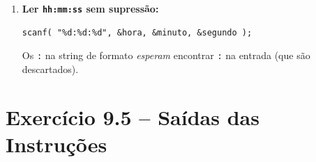 \documentclass[12pt,a4paper]{article}
\begin{document}
\begin{respostabox}
\begin{enumerate}[label=\textbf{\alph*)}]
\item \textbf{Ler \texttt{hh:mm:ss} sem supressão:}
\begin{lstlisting}
scanf( "%d:%d:%d", &hora, &minuto, &segundo );
\end{lstlisting}
Os \texttt{:} na string de formato \textit{esperam} encontrar \texttt{:} na entrada
(que são descartados).

\end{enumerate}
\end{respostabox}

\newpage

\section{Exercício 9.5 -- Saídas das Instruções}
\end{document}
